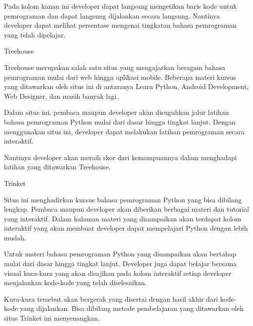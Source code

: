 \noindent 
{\fontsize{14pt}{14pt}\selectfont Pada kolom kanan ini developer dapat langsung mengetikan baris kode untuk pemrograman dan dapat langsung dijalankan secara langsung. Nantinya developer dapat melihat persentase mengenai tingkatan bahasa pemrograman yang telah dipelajar. \\} \par
\noindent 
{\fontsize{14pt}{14pt}\selectfont Treehouse \\} \par
\noindent 
{\fontsize{14pt}{14pt}\selectfont Treehouse merupakan salah satu situs yang mengajarkan beragam bahasa pemrograman mulai dari web hingga aplikasi mobile. Beberapa materi kursus yang ditawarkan oleh situs ini di antaranya Learn Python, Android Development, Web Designer, dan masih banyak lagi. \\} \par
\noindent 
{\fontsize{14pt}{14pt}\selectfont Dalam situs ini, pembaca maupun developer akan disuguhkan jalur latihan bahasa pemrograman Python mulai dari dasar hingga tingkat lanjut. Dengan menggunakan situs ini, developer dapat melakukan latihan pemrograman secara interaktif. \\} \par
\noindent 
{\fontsize{14pt}{14pt}\selectfont Nantinya developer akan meraih skor dari kemampuannya dalam menghadapi latihan yang ditawarkan Treehouse. \\} \par
\noindent 
{\fontsize{14pt}{14pt}\selectfont Trinket \\} \par
\noindent 
{\fontsize{14pt}{14pt}\selectfont Situs ini menghadirkan kursus bahasa pemrograman Python yang bisa dibilang lengkap.  $  $Pembaca maupun developer akan diberikan berbagai materi dan tutorial yang interaktif. Dalam halaman materi yang disampaikan akan terdapat kolom interaktif yang akan membuat developer dapat mempelajari Python dengan lebih mudah. \\} \par
\noindent 
{\fontsize{14pt}{14pt}\selectfont Untuk materi bahasa pemrograman Python yang disampaikan akan bertahap mulai dari dasar hingga tingkat lanjut. Developer juga dapat belajar bersama visual kura-kura yang akan disajikan pada kolom interaktif setiap developer menjalankan kode-kode yang telah diselesaikan. \\} \par
\noindent 
{\fontsize{14pt}{14pt}\selectfont Kura-kura tersebut akan bergerak yang disertai dengan hasil akhir dari kode-kode yang dijalankan. Bisa dibilang metode pembelajaran yang ditawarkan oleh situs Trinket ini menyenangkan. \\} \par

